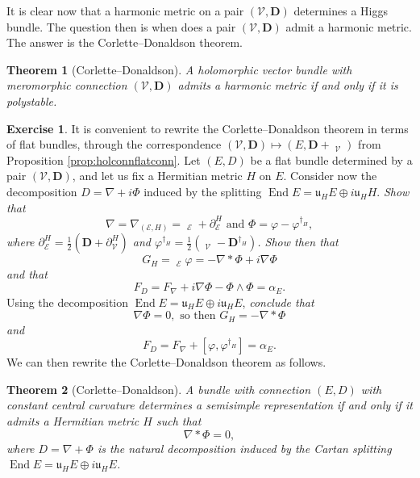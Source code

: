 \documentclass[12pt,a4paper]{amsbook}
\newtheorem{thm}{Theorem}[chapter]
\theoremstyle{remark} \newtheorem{rmk}[thm]{Remark}
\theoremstyle{definition} \newtheorem{defn}[thm]{Definition}
\theoremstyle{definition} \newtheorem{ex}[thm]{Example}
\theoremstyle{definition} \newtheorem{ej}{Exercise}
\newcommand{\fu}{\mathfrak u}
\newcommand{\sE}{\mathscr E}
\newcommand{\sV}{\mathscr V}
\DeclareMathOperator{\End}{End}
\DeclareMathOperator{\delbar}{\bar{\partial}}
\begin{document}
It is clear now that a harmonic metric on a pair $(\sV,\bm{D})$ determines a Higgs bundle. The question then is when does a pair $(\sV,\bm{D})$ admit a harmonic metric. The answer is the Corlette--Donaldson theorem.

\begin{thm}[Corlette--Donaldson]
A holomorphic vector bundle with meromorphic connection $(\sV,\bm{D})$ admits a harmonic metric if and only if it is polystable.
\end{thm}

\begin{ej}
  It is convenient to rewrite the Corlette--Donaldson theorem in terms of flat bundles, through the correspondence $(\sV,\bm{D})\mapsto (E,\bm{D}+\delbar_{\sV})$ from Proposition \ref{prop:holconnflatconn}. Let $(E,D)$ be a flat bundle determined by a pair $(\sV,\bm{D})$, and let us fix a Hermitian metric $H$ on $E$. Consider now the decomposition $D=\nabla + i\Phi$ induced by the splitting $\End E = \fu_H E \oplus i \fu_H H$. \textit{Show that}
\begin{equation*}
\nabla = \nabla_{(\sE,H)} = \delbar_{\sE} + \partial_{\sE}^{H} \text{ and } \Phi = \varphi - \varphi^{\dagger_H},
\end{equation*}
\textit{where $\partial_{\sE}^{H} = \tfrac{1}{2}(\bm{D} + \partial_{\sV}^{H})$ and $\varphi^{\dagger_H}=\tfrac{1}{2}(\delbar_{\sV}-\bm{D}^{\dagger_H})$. Show then that}
\begin{equation*}
G_H = \delbar_{\sE} \varphi = -\nabla * \Phi + i \nabla\Phi
\end{equation*}
\textit{and that}
\begin{equation*}
F_D = F_\nabla + i\nabla \Phi - \Phi \wedge \Phi =  \alpha_E.
\end{equation*}
Using the decomposition $\End E = \fu_H E \oplus i \fu_H E$, \textit{conclude that}
\begin{equation*}
\nabla\Phi = 0, \text{ so then } G_H = -\nabla* \Phi
\end{equation*}
\textit{and}
\begin{equation*}
F_D = F_\nabla + [\varphi,\varphi^{\dagger_H}] =  \alpha_E.
\end{equation*}
We can then rewrite the Corlette--Donaldson theorem as follows.
\end{ej}

\begin{thm}[Corlette--Donaldson]
  A bundle with connection $(E,D)$ with constant central curvature determines a semisimple representation if and only if it admits a Hermitian metric $H$ such that
  \begin{equation*}
\nabla * \Phi = 0,
  \end{equation*}
where $D=\nabla + \Phi$ is the natural decomposition induced by the Cartan splitting $\End E = \fu_H E \oplus i \fu_H E$.
\end{thm}
\end{document}
